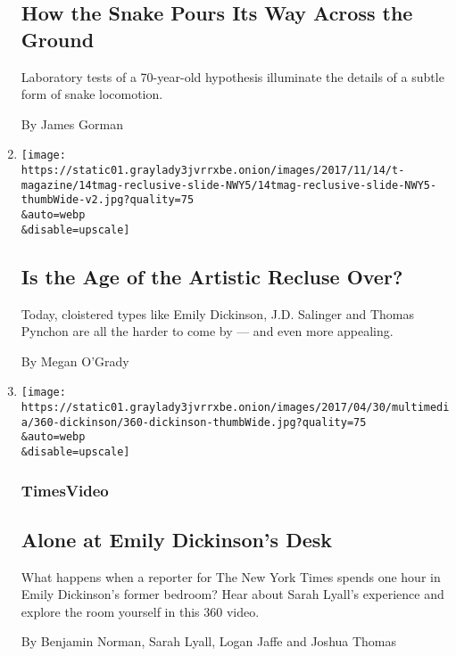 \begin{enumerate}
  \hypertarget{how-the-snake-pours-its-way-across-the-ground}{%
  \subsection{How the Snake Pours Its Way Across the
  Ground}\label{how-the-snake-pours-its-way-across-the-ground}}

  Laboratory tests of a 70-year-old hypothesis illuminate the details of
  a subtle form of snake locomotion.

  By James Gorman
\item
  \href{/2017/11/14/t-magazine/artistic-recluse-jd-salinger-thomas-pynchon.html}{}

  \texttt{[image: https://static01.graylady3jvrrxbe.onion/images/2017/11/14/t-magazine/14tmag-reclusive-slide-NWY5/14tmag-reclusive-slide-NWY5-thumbWide-v2.jpg?quality=75\\\&auto=webp\\\&disable=upscale]}

  \hypertarget{is-the-age-of-the-artistic-recluse-over}{%
  \subsection{Is the Age of the Artistic Recluse
  Over?}\label{is-the-age-of-the-artistic-recluse-over}}

  Today, cloistered types like Emily Dickinson, J.D. Salinger and Thomas
  Pynchon are all the harder to come by --- and even more appealing.

  By Megan O'Grady
\item
  \href{/video/books/100000005045504/emily-dickinson-bedroom-writing-alone-360.html}{}

  \texttt{[image: https://static01.graylady3jvrrxbe.onion/images/2017/04/30/multimedia/360-dickinson/360-dickinson-thumbWide.jpg?quality=75\\\&auto=webp\\\&disable=upscale]}

  \hypertarget{timesvideo}{%
  \subsubsection{TimesVideo}\label{timesvideo}}

  \hypertarget{alone-at-emily-dickinsons-desk}{%
  \subsection{Alone at Emily Dickinson's
  Desk}\label{alone-at-emily-dickinsons-desk}}

  What happens when a reporter for The New York Times spends one hour in
  Emily Dickinson's former bedroom? Hear about Sarah Lyall's experience
  and explore the room yourself in this 360 video.

  By Benjamin Norman, Sarah Lyall, Logan Jaffe and Joshua Thomas
\end{enumerate}

